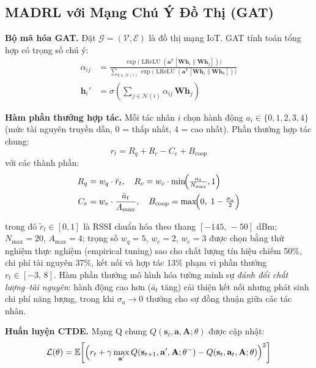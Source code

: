\documentclass[12pt, a4paper]{article}
\begin{document}
\subsection{MADRL với Mạng Chú Ý Đồ Thị (GAT)}
\label{subsec:madrl}

\textbf{Bộ mã hóa GAT.}
Đặt $\mathcal{G} = (\mathcal{V}, \mathcal{E})$ là đồ thị mạng IoT.
GAT tính toán tổng hợp có trọng số chú ý:
\begin{align}
  \alpha_{ij} &= \frac{
    \exp\!\bigl(\operatorname{LReLU}(
      \mathbf{a}^{\mathsf{T}}[\mathbf{W}\mathbf{h}_i \| \mathbf{W}\mathbf{h}_j]
    )\bigr)
  }{
    \sum_{k \in \mathcal{N}(i)} \exp\!\bigl(\operatorname{LReLU}(
      \mathbf{a}^{\mathsf{T}}[\mathbf{W}\mathbf{h}_i \| \mathbf{W}\mathbf{h}_k]
    )\bigr)
  }
  \label{eq:gat_attn} \\
  \mathbf{h}_i' &= \sigma\!\left(\sum_{j \in \mathcal{N}(i)}
    \alpha_{ij}\,\mathbf{W}\mathbf{h}_j\right)
  \label{eq:gat_agg}
\end{align}

\textbf{Hàm phần thưởng hợp tác.}
Mỗi tác nhân $i$ chọn hành động
$a_i \in \{0,1,2,3,4\}$ (mức tài nguyên truyền dẫn,
0 = thấp nhất, 4 = cao nhất).
Phần thưởng hợp tác chung:
\begin{equation}
  r_t = R_q + R_c - C_e + B_{\text{coop}}
  \label{eq:reward}
\end{equation}
với các thành phần:
\begin{align}
  R_q &= w_q \cdot \tilde{r}_t, \quad
  R_c = w_c \cdot \min\!\Bigl(\tfrac{n_t}{N_{\max}}, 1\Bigr) \notag \\
  C_e &= w_e \cdot \frac{\bar{a}_t}{A_{\max}}, \quad
  B_{\text{coop}} = \max\!\Bigl(0,\; 1 - \tfrac{\sigma_a}{2}\Bigr)
  \label{eq:reward_components}
\end{align}

trong đó $\tilde{r}_t \in [0,1]$ là RSSI chuẩn hóa theo thang
$[-145,\,-50]$ dBm; $N_{\max} = 20$, $A_{\max} = 4$;
trọng số $w_q = 5$, $w_c = 2$, $w_e = 3$ được chọn bằng
thử nghiệm thực nghiệm (empirical tuning) sao cho chất lượng tín
hiệu chiếm 50\%, chi phí tài nguyên 37\%, kết nối và hợp tác
13\% phạm vi phần thưởng $r_t \in [-3,\,8]$.
Hàm phần thưởng mô hình hóa tường minh sự \emph{đánh đổi
chất lượng--tài nguyên}: hành động cao hơn ($\bar{a}_t$ tăng)
cải thiện kết nối nhưng phát sinh chi phí năng lượng, trong khi
$\sigma_a \to 0$ thưởng cho sự đồng thuận giữa các tác nhân.

\textbf{Huấn luyện CTDE.}
Mạng Q chung $Q(\mathbf{s}_t, \mathbf{a}, \mathbf{A};\theta)$
được cập nhật:
\begin{equation}
  \mathcal{L}(\theta) = \mathbb{E}\!\left[
  \Bigl(r_t + \gamma \max_{\mathbf{a}'} Q(\mathbf{s}_{t+1},
  \mathbf{a}', \mathbf{A};\theta^{-})
  - Q(\mathbf{s}_t, \mathbf{a}_t, \mathbf{A};\theta)\Bigr)^{2}
  \right]
  \label{eq:dqn_loss}
\end{equation}
\end{document}
